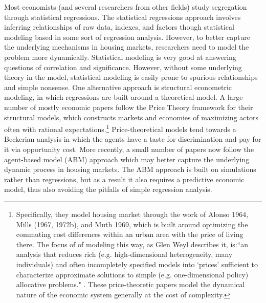 {Most economists (and several researchers from other fields) study segregation through statistical regressions. The statistical regressions approach involves inferring relationships of raw data, indexes, and factors though statistical modeling based in some sort of regression analysis. However, to better capture the underlying mechanisms in housing markets, researchers need to model the problem more dynamically. Statistical modeling is very good at answering questions of correlation and significance. However, without some underlying theory in the model, statistical modeling is easily prone to spurious relationships and simple nonsense.  One alternative approach is structural econometric modeling, in which regressions are built around a theoretical model. A large number of mostly economic papers follow the Price Theory framework for their structural models, which constructs markets and economies of maximizing actors often with rational expectations.\footnote{Specifically, they model housing market through the work of Alonso 1964\cite{alonso64}, Mills (1967, 1972b)\cite{mills67,mills72a,mills72b}, and Muth 1969\cite{muth69}, which is built around optimizing the commuting cost differences within an urban area with the price of living there. The focus of of modeling this way, as Glen Weyl describes it, is:``an analysis that reduces rich (e.g. high-dimensional heterogeneity, many individuals) and often incompletely specified models into `prices’ sufficient to characterize approximate solutions to simple (e.g. one-dimensional policy) allocative problems." \cite{weyl15}. These price-theoretic papers model the dynamical nature of the economic system generally at the cost of complexity.} Price-theoretical models tend towards a Beckerian analysis in which the agents have a taste for discrimination and pay for it via opportunity cost. More recently, a small number of papers now follow the agent-based model (ABM) approach which may better capture the underlying dynamic process in housing markets. The ABM approach is built on simulations rather than regressions, but as a result it also requires a predictive economic model, thus also avoiding the pitfalls of simple regression analysis.  

}
